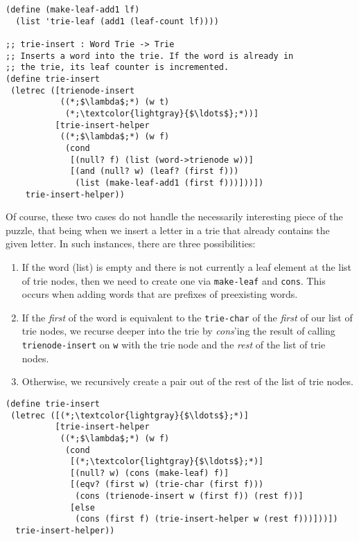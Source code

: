 \begin{cl}[]{}
\begin{lstlisting}[language=MyScheme]
(define (make-leaf-add1 lf)
  (list 'trie-leaf (add1 (leaf-count lf))))

;; trie-insert : Word Trie -> Trie
;; Inserts a word into the trie. If the word is already in
;; the trie, its leaf counter is incremented.
(define trie-insert
 (letrec ([trienode-insert
           ((*;$\lambda$;*) (w t)
            (*;\textcolor{lightgray}{$\ldots$};*))]
          [trie-insert-helper
           ((*;$\lambda$;*) (w f)
            (cond
             [(null? f) (list (word->trienode w))]
             [(and (null? w) (leaf? (first f))) 
              (list (make-leaf-add1 (first f)))]))])
    trie-insert-helper))
\end{lstlisting}
\end{cl}

Of course, these two cases do not handle the necessarily interesting piece of the puzzle, that being when we insert a letter in a trie that already contains the given letter. In such instances, there are three possibilities:

\begin{enumerate}
  \item If the word (list) is empty and there is not currently a leaf element at the list of trie nodes, then we need to create one via \texttt{make-leaf} and \texttt{cons}. This occurs when adding words that are prefixes of preexisting words.
  \item If the \textit{first} of the word is equivalent to the \texttt{trie-char} of the \textit{first} of our list of trie nodes, we recurse deeper into the trie by \textit{cons}'ing the result of calling \texttt{trienode-insert} on \texttt{w} with the trie node and the \textit{rest} of the list of trie nodes. 
  \item Otherwise, we recursively create a pair out of the rest of the list of trie nodes.
\end{enumerate}

\begin{cl}[]{}
\begin{lstlisting}[language=MyScheme]
(define trie-insert
 (letrec ([(*;\textcolor{lightgray}{$\ldots$};*)]
          [trie-insert-helper
           ((*;$\lambda$;*) (w f)
            (cond
             [(*;\textcolor{lightgray}{$\ldots$};*)]
             [(null? w) (cons (make-leaf) f)]
             [(eqv? (first w) (trie-char (first f))) 
              (cons (trienode-insert w (first f)) (rest f))]
             [else 
              (cons (first f) (trie-insert-helper w (rest f)))]))])
  trie-insert-helper))
\end{lstlisting}
\end{cl}

